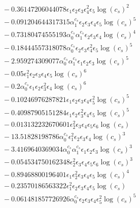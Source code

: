 \documentclass[10pt]{article}
\begin{document}
\begin{align*}
&{}  - 0.36147206044078 \epsilon_{1} \epsilon_{2} \epsilon_{3} \epsilon_{4}^{2} \epsilon_{5} \log{\left(c_{s} \right)}^{2} \\
&{}  - 0.091204644317315 \alpha_{1}^{c_s} \epsilon_{2} \epsilon_{3} \epsilon_{4} \epsilon_{5} \log{\left(c_{s} \right)}^{5} \\
&{}  - 0.73180474555193 \alpha_{0}^{c_s} \alpha_{1}^{c_s} \epsilon_{2} \epsilon_{3} \epsilon_{4} \log{\left(c_{s} \right)}^{4} \\
&{}  - 0.18444557318078 \alpha_{0}^{c_s} \epsilon_{2} \epsilon_{3} \epsilon_{4}^{2} \epsilon_{5} \log{\left(c_{s} \right)}^{5} \\
&{}  - 2.959274309077 \alpha_{0}^{c_s} \alpha_{1}^{c_s} \epsilon_{1} \epsilon_{2} \epsilon_{3} \log{\left(c_{s} \right)}^{5} \\
&{}  - 0.05 \epsilon_{1}^{2} \epsilon_{2} \epsilon_{3} \epsilon_{4} \epsilon_{5} \log{\left(c_{s} \right)}^{6} \\
&{}  - 0.2 \alpha_{0}^{c_s} \epsilon_{1} \epsilon_{2} \epsilon_{3}^{2} \epsilon_{4} \log{\left(c_{s} \right)}^{6} \\
&{}  - 0.10246976287821 \epsilon_{1} \epsilon_{2} \epsilon_{3} \epsilon_{4} \epsilon_{5}^{2} \log{\left(c_{s} \right)}^{5} \\
&{}  - 0.40987905151284 \epsilon_{1} \epsilon_{2} \epsilon_{3}^{2} \epsilon_{4} \epsilon_{5} \log{\left(c_{s} \right)}^{5} \\
&{}  - 0.013132232670601 \epsilon_{2}^{2} \epsilon_{3} \epsilon_{4} \epsilon_{5} \epsilon_{6} \log{\left(c_{s} \right)} \\
&{}  - 13.51828198786 \alpha_{0}^{c_s} \epsilon_{1}^{2} \epsilon_{2} \epsilon_{3} \epsilon_{4} \log{\left(c_{s} \right)}^{3} \\
&{}  - 3.4169640369034 \alpha_{0}^{c_s} \alpha_{1}^{c_s} \epsilon_{1} \epsilon_{2} \epsilon_{3} \log{\left(c_{s} \right)}^{3} \\
&{}  - 0.054534750162348 \epsilon_{2}^{2} \epsilon_{3} \epsilon_{4} \epsilon_{5} \epsilon_{6} \log{\left(c_{s} \right)}^{3} \\
&{}  - 0.89468800196401 \epsilon_{1} \epsilon_{2}^{2} \epsilon_{3} \epsilon_{4} \epsilon_{5} \log{\left(c_{s} \right)}^{4} \\
&{}  - 0.23570186563322 \epsilon_{1}^{2} \epsilon_{2} \epsilon_{3} \epsilon_{4} \epsilon_{5} \log{\left(c_{s} \right)} \\
&{}  - 0.061481857726926 \alpha_{0}^{c_s} \epsilon_{2} \epsilon_{3} \epsilon_{4} \epsilon_{5}^{2} \log{\left(c_{s} \right)}^{5} \\

\end{align*}
\end{document}
